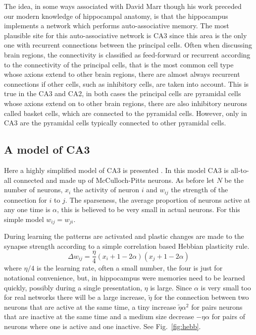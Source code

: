 \documentclass[11pt,a4paper]{scrartcl}
\begin{document}
The idea, in some ways associated with David Marr though his work
preceded our modern knowledge of hippocampal anatomy, is that the
hippocampus implements a network which performs auto-associative
memory. The most plausible site for this auto-associative network is
CA3 since this area is the only one with recurrent connections between
the principal cells. Often when discussing brain regions, the
connectivity is classified as feed-forward or recurrent according to
the connectivity of the principal cells, that is the most common cell
type whose axions extend to other brain regions, there are almost
always recurrent connections if other cells, such as inhibitory cells,
are taken into account. This is true in the CA3 and CA2, in both cases
the principal cells are pyramidal cells whose axions extend on to
other brain regions, there are also inhibitory neurons called basket
cells, which are connected to the pyramidal cells. However, only in
CA3 are the pyramidal cells typically connected to other pyramidal
cells.

\subsection*{A model of CA3}
Here a highly simplified model of CA3 is presented
\cite{Amit1992a}. In this model CA3 is all-to-all connected and made
up of McCulloch-Pitts neurons. As before let $N$ be the number
of neurons, $x_i$ the activity of neuron $i$ and $w_{ij}$ the strength
of the connection for $i$ to $j$. The sparseness, the average
proportion of neurons active at any one time is $\alpha$, this is believed
to be very small in actual neurons. For this simple model $w_{ij}=w_{ji}$.

During learning the patterns are activated and plastic changes are
made to the synapse strength according to a simple correlation based Hebbian plasticity rule.
\begin{equation}
\Delta w_{ij}=\frac{\eta}{4} (x_i+1-2\alpha)(x_j+1-2\alpha)
\end{equation}
where $\eta/4$ is the learning rate, often a small number, the four is
just for notational convenience, but, in hippocampus were memories
need to be learned quickly, possibly during a single presentation,
$\eta$ is large. Since $\alpha$ is very small too for real networks
there will be a large increase, $\tilde \eta$ for the connection
between two neurons that are active at the same time, a tiny increase
$\tilde \eta\alpha^2$ for pairs neurons that are inactive at the same
time and a medium size decrease $-\eta \alpha $ for pairs of neurons where one is
active and one inactive. See Fig.~\ref{fig:hebb}.
\end{document}
